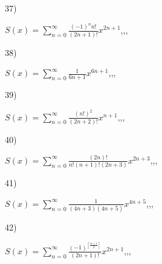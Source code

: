 \documentclass[11pt, ukrainian]{article}
\begin{document}
\par
\vspace{0.9cm}
37) \space 
{%
{$S(x)=\sum\limits_{n=0}^{\infty}{\frac{{(-1)^n}{n!}}{(2n+1)!}}{x^{{2n+1}}}$},,, \par \smallskip  
}
\par
\vspace{0.9cm}
38) \space 
{%
{$S(x)=\sum\limits_{n=0}^{\infty}{\frac{1}{6n+1}}{x^{{6n+1}}}$},,, \par \smallskip  
}
\par
\vspace{0.9cm}
39) \space 
{%
{$S(x)=\sum\limits_{n=0}^{\infty}{\frac{(n!)^2}{(2n+2)!}}{x^{{n+1}}}$},,, \par \smallskip  
}
\par
\vspace{0.9cm}
40) \space 
{%
{$S(x)=\sum\limits_{n=0}^{\infty}{\frac{(2n)!}{n!(n+1)!(2n+3)}}{x^{{2n+3}}}$},,, \par \smallskip  
}
\par
\newpage
41) \space 
{%
{$S(x)=\sum\limits_{n=0}^{\infty}{\frac{1}{(4n+3)(4n+5)}}{x^{{4n+5}}}$},,, \par \smallskip  
}
\par
\vspace{0.9cm}
42) \space 
{%
{$S(x)=\sum\limits_{n=0}^{\infty}{\frac{(-1)^{[\frac{n+1}{2}]}}{(2n+1)!}}{x^{{2n+1}}}$},,, \par \smallskip  
}
\end{document}
